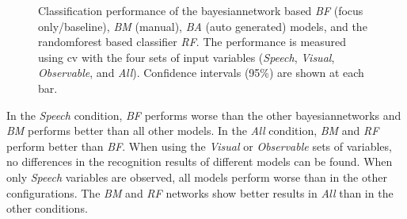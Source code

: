 \begin{figure}[tbh]
  \centering
  
    \caption[One vs. all cross validation results.]{\label{fig:study-addressee-bn-cv} 
    Classification performance of the \gls{bayesiannetwork} based \emph{BF} (focus only/baseline), \emph{BM} (manual), \emph{BA} (auto generated) models, and the \gls{randomforest} based classifier \emph{RF}.
    The performance is measured using \gls{cv} with the four sets of input variables (\emph{Speech}, \emph{Visual}, \emph{Observable}, and \emph{All}).   Confidence intervals (95\%) are shown at each bar.
    }
\end{figure}

In the \emph{Speech} condition, \emph{BF} performs worse than the other \glspl{bayesiannetwork} and \emph{BM} performs better than all other models.
In the \emph{All} condition, \emph{BM} and \emph{RF} perform better than \emph{BF}.
When using the \emph{Visual} or \emph{Observable} sets of variables, no differences in the recognition results of different models can be found.
When only \emph{Speech} variables are observed, all models perform worse than in the other configurations.
The \emph{BM} and \emph{RF} networks show better results in \emph{All} than in the other conditions.

